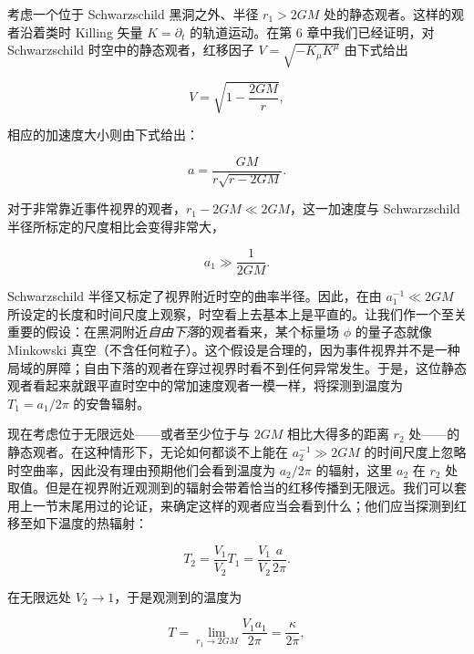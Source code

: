 
考虑一个位于 Schwarzschild 黑洞之外、半径 $r_{1} > 2GM$ 处的静态观者。这样的观者沿着类时 Killing 矢量 $K = \partial_{t}$ 的轨道运动。在第 6 章中我们已经证明，对 Schwarzschild 时空中的静态观者，红移因子 $V = \sqrt{-K_{\mu}K^{\mu}}$ 由下式给出

\begin{equation*}
V = \sqrt{1 - \frac{2GM}{r}},
\tag{9.169}
\end{equation*}

相应的加速度大小则由下式给出：

\begin{equation*}
a = \frac{GM}{r\sqrt{r - 2GM}}.
\tag{9.170}
\end{equation*}

对于非常靠近事件视界的观者，$r_{1} - 2GM \ll 2GM$，这一加速度与 Schwarzschild 半径所标定的尺度相比会变得非常大，

\begin{equation*}
a_{1} \gg \frac{1}{2GM}.
\tag{9.171}
\end{equation*}

Schwarzschild 半径又标定了视界附近时空的曲率半径。因此，在由 $a_{1}^{-1} \ll 2GM$ 所设定的长度和时间尺度上观察，时空看上去基本上是平直的。让我们作一个至关重要的假设：在黑洞附近\emph{自由下落}的观者看来，某个标量场 $\phi$ 的量子态就像 Minkowski 真空（不含任何粒子）。这个假设是合理的，因为事件视界并不是一种局域的屏障；自由下落的观者在穿过视界时看不到任何异常发生。于是，这位静态观者看起来就跟平直时空中的常加速度观者一模一样，将探测到温度为 $T_{1} = a_{1}/2\pi$ 的安鲁辐射。

现在考虑位于无限远处——或者至少位于与 $2GM$ 相比大得多的距离 $r_{2}$ 处——的静态观者。在这种情形下，无论如何都谈不上能在 $a_{2}^{-1} \gg 2GM$ 的时间尺度上忽略时空曲率，因此没有理由预期他们会看到温度为 $a_{2}/2\pi$ 的辐射，这里 $a_{2}$ 在 $r_{2}$ 处取值。但是在视界附近观测到的辐射会带着恰当的红移传播到无限远。我们可以套用上一节末尾用过的论证，来确定这样的观者应当会看到什么；他们应当探测到红移至如下温度的热辐射：

\begin{equation*}
T_{2} = \frac{V_{1}}{V_{2}} T_{1} = \frac{V_{1}}{V_{2}} \frac{a}{2\pi}.
\tag{9.172}
\end{equation*}

在无限远处 $V_{2} \to 1$，于是观测到的温度为

\begin{equation*}
T = \lim_{r_{1} \to 2GM} \frac{V_{1} a_{1}}{2\pi} = \frac{\kappa}{2\pi},
\tag{9.173}
\end{equation*}

